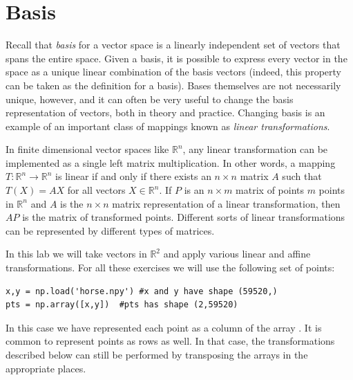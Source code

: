 \label{lab:ChangeBasis}



\section*{Basis}

Recall that \emph{basis} for a vector space is a linearly independent set of vectors
that spans the entire space. Given a basis, it is possible to express
every vector in the space as a unique linear combination of the basis vectors
(indeed, this property can be taken as the definition for a basis).
Bases themselves are not necessarily unique, however, and it can often be
very useful to change the basis representation of vectors, both in theory and
practice. Changing basis is an example of an important class of mappings
known as \emph{linear transformations}.

In finite dimensional vector spaces like $\mathbb{R}^n$, any linear
transformation can be implemented as a single left matrix multiplication.
In other words, a mapping $T : \mathbb{R}^n \to \mathbb{R}^n$ is linear if and
only if there exists an $n \times n$ matrix $A$ such that $T\left(X\right) = AX$
for all vectors $X \in \mathbb{R}^n$.
If $P$ is an $n \times m$ matrix of points $m$ points in $\mathbb{R}^n$ and $A$
is the $n \times n$ matrix representation of a linear transformation, then $AP$
is the matrix of transformed points.
Different sorts of linear transformations can be represented by different types
of matrices.

In this lab we will take vectors in $\mathbb{R}^2$ and apply various linear and
affine transformations.
For all these exercises we will use the following set of points:
\begin{lstlisting}
x,y = np.load('horse.npy') #x and y have shape (59520,)
pts = np.array([x,y])  #pts has shape (2,59520)
\end{lstlisting}
In this case we have represented each point as a column of the array .
It is common to represent points as rows as well.
In that case, the transformations described below can still be performed by
transposing the arrays in the appropriate places.

